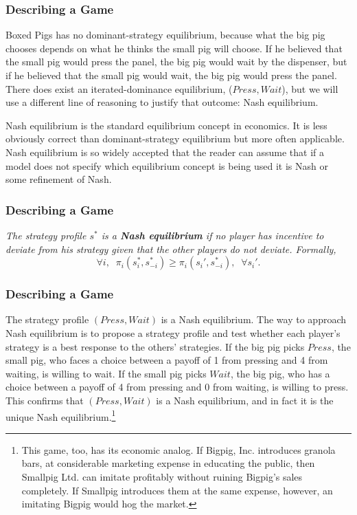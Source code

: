  \begin{frame}[fragile]\frametitle{Describing a Game}

    { Boxed Pigs}   has no dominant-strategy equilibrium, because what the big
pig chooses depends on what he thinks the small pig will choose.  If he believed
that the small pig would press the panel, the big     pig would wait by the
dispenser, but if he believed that the small pig would wait, the big   pig would
press the panel.  There does exist an iterated-dominance equilibrium, ($Press,
Wait$), but we will use a different line of reasoning to justify that outcome:
Nash equilibrium.

Nash equilibrium is  the standard equilibrium concept  in economics. It is less
obviously correct than dominant-strategy equilibrium but more often applicable.
Nash equilibrium is so widely accepted that the reader can assume that if a
model does not specify which equilibrium concept is being used it is Nash or
some refinement of Nash.

\end{frame}
 \begin{frame}[fragile]\frametitle{Describing a Game}
  {\it The strategy profile $s^*$ is a {\bf Nash equilibrium} if no player has
incentive to deviate from his strategy given that the other players do not
deviate.  Formally, }
  \begin{equation} \label{e6}
\forall i,\;\; \pi_i(s_i^*,s_{-i}^*) \geq \pi_i(s_i',s_{-i}^*),\;\; \forall
s_i'.
  \end{equation}

\end{frame}
 \begin{frame}[fragile]\frametitle{Describing a Game}
     The strategy profile $(Press, Wait)$ is a Nash equilibrium. The way to
approach Nash equilibrium is to propose a strategy profile and test whether each
player's strategy is a best response to the others' strategies. If the big pig
picks $Press$, the small pig, who faces a choice between a payoff of 1 from
pressing and 4 from waiting, is willing to wait. If the small pig picks $Wait$,
the big pig, who has a choice between a payoff of 4 from pressing and 0 from
waiting, is willing to press.  This confirms that $(Press, Wait)$ is a Nash
equilibrium, and in fact it is the unique Nash equilibrium.\footnote{This game,
too, has its economic analog. If Bigpig, Inc. introduces granola bars,  at
considerable marketing expense in educating the public, then Smallpig Ltd. can
imitate profitably without  ruining Bigpig's sales completely. If Smallpig
introduces them  at the same expense, however, an imitating Bigpig  would hog
the market.}

\end{frame}
